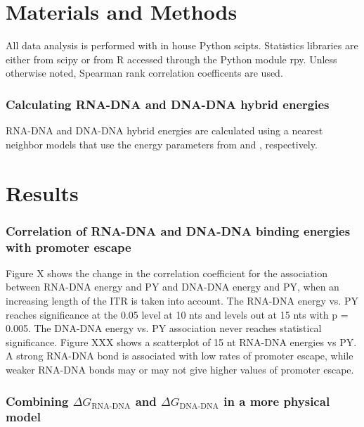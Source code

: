\documentclass[a4paper]{article}
\begin{document}
 


\section{Materials and Methods}

All data analysis is performed with in house Python scipts. Statistics libraries
are either from scipy or from R accessed through the Python module rpy. Unless
otherwise noted, Spearman rank correlation coefficents are used.

\subsubsection{Calculating RNA-DNA and DNA-DNA hybrid energies}

RNA-DNA and DNA-DNA hybrid energies are calculated using a nearest neighbor
models that use the energy parameters from \cite{wu_temperature_2002-1} and
\cite{santalucia_thermodynamics_2004}, respectively.

\section{Results}

\subsubsection{Correlation of RNA-DNA and DNA-DNA binding energies with promoter
escape}

Figure X shows the change in the correlation
coefficient for the association between RNA-DNA energy and PY and DNA-DNA
energy and PY, when an increasing length of the ITR is taken into account. The
RNA-DNA energy vs. PY reaches significance at the 0.05 level at 10 nts and
levels out at 15 nts with p = 0.005. The DNA-DNA energy vs. PY association never
reaches statistical significance. Figure XXX shows a scatterplot of 15 nt
RNA-DNA energies vs PY. A strong RNA-DNA bond is associated with low rates of
promoter escape, while weaker RNA-DNA bonds may or may not give higher values of
promoter escape.

\subsubsection{Combining $\Delta G_{\text{RNA-DNA}}$ and $\Delta
G_{\text{DNA-DNA}}$ in a more physical model}
\end{document}
